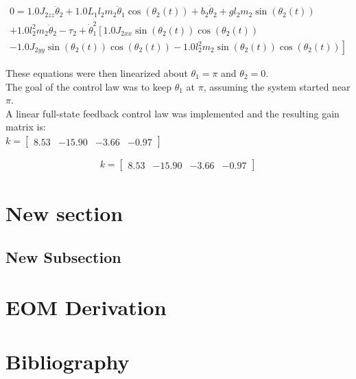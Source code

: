 \documentclass[letterpaper,10pt,oneside]{article}
\begin{document}
\begin{multline}
  0 = 1.0 J_{2zz} \ddot{\theta}_{2} + 1.0 L_{1} l_{2} m_{2} \ddot{\theta}_{1} \cos{\left(\theta_{2}{\left(t \right)} \right)} + b_{2} \dot{\theta}_{2} + g l_{2} m_{2} \sin{\left(\theta_{2}{\left(t \right)} \right)}
      \\
   + 1.0 l_{2}^{2} m_{2} \ddot{\theta}_{2} - \tau_{2} + \dot{\theta}_{1}^{2} \left[1.0 J_{2xx} \sin{\left(\theta_{2}{\left(t \right)} \right)} \cos{\left(\theta_{2}{\left(t \right)} \right)}
\right.
\\
\left.
   - 1.0 J_{2yy} \sin{\left(\theta_{2}{\left(t \right)} \right)} \cos{\left(\theta_{2}{\left(t \right)} \right)} - 1.0 l_{2}^{2} m_{2} \sin{\left(\theta_{2}{\left(t \right)} \right)} \cos{\left(\theta_{2}{\left(t \right)} \right)}\right]
\end{multline}

These equations were then linearized about $\theta_{1} = \pi$ and $\theta_{2} = 0.$ \\
The goal of the control law was to keep $\theta_{1}$ at  $\pi$, assuming the system started near $\pi$.\\

A linear full-state feedback control law was implemented and the resulting gain matrix is: \\

$ k =
\begin{bmatrix}
  8.53 &
  -15.90 &
  -3.66 &
  -0.97
\end{bmatrix}$

\begin{align}
  k = \left[\begin{array}{cccc}
  8.53 &
  -15.90 &
  -3.66 &
  -0.97
  \end{array}\right]
\end{align}


\section{New section}
\subsection{New Subsection}

\newpage




\newpage
\appendix
\section{EOM Derivation}
\label{EOM}

\section{Bibliography}
\printbibliography
\end{document}
